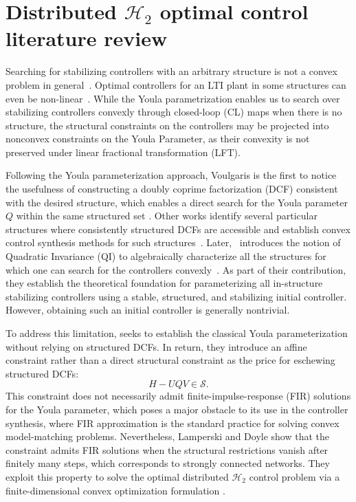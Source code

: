 \section{Distributed \(\mathcal{H}_2\) optimal control literature review}

Searching for stabilizing controllers with an arbitrary structure is not a convex problem in general~\cite{Tsitsiklis1985NP_decentralized}. Optimal controllers for an LTI plant in some structures can even be non-linear~\cite{ Witsenhausen1968ACI}. While the Youla parametrization enables us to search over stabilizing controllers convexly through closed-loop (CL) maps \cite{YoulaPar} when there is no structure, the structural constraints on the controllers may be projected into nonconvex constraints on the Youla Parameter, as their convexity is not preserved under linear fractional transformation (LFT).

Following the Youla parameterization approach, Voulgaris is the first to notice the usefulness of constructing a doubly coprime factorization (DCF) consistent with the desired structure, which enables a direct search for the Youla parameter \(Q\) within the same structured set \cite{Voulgaris2001convexity}. Other works identify several particular structures where consistently structured DCFs are accessible and establish convex control synthesis methods for such structures~\cite{Voulgaris2000nested, XinQ2004Nested, Bamieh2005CvxSI}. Later,~\cite{SanjayLQIsufficient} introduces the notion of Quadratic Invariance (QI) to algebraically characterize all the structures for which one can search for the controllers convexly~\cite{LessardQI}. As part of their contribution, they establish the theoretical foundation for parameterizing all in-structure stabilizing controllers using a stable, structured, and stabilizing initial controller. However, obtaining such an initial controller is generally nontrivial.


To address this limitation, \cite{SabauVectorization} seeks to establish the classical Youla parameterization without relying on structured DCFs. In return, they introduce an affine constraint rather than a direct structural constraint as the price for eschewing structured DCFs:
\begin{equation}\label{eqn:strcst_0}
    H - U Q V \in \mathcal{S}.
\end{equation}
This constraint does not necessarily admit finite-impulse-response (FIR) solutions for the Youla parameter, which poses a major obstacle to its use in the controller synthesis, where FIR approximation is the standard practice for solving convex model-matching problems. Nevertheless, Lamperski and Doyle show that the constraint admits FIR solutions when the structural restrictions vanish after finitely many steps, which corresponds to strongly connected networks. They exploit this property to solve the optimal distributed \(\mathcal{H}_2\) control problem via a finite-dimensional convex optimization formulation \cite{Lamperski2015H2}.


